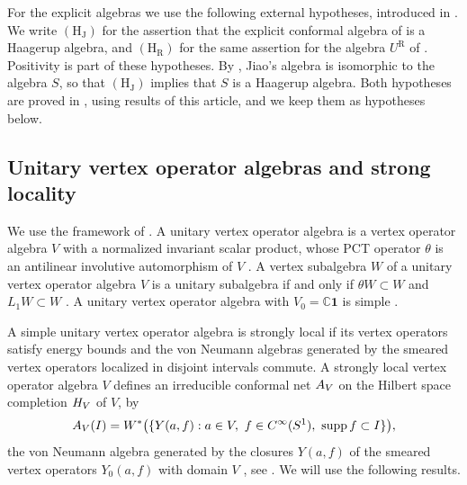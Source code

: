 \documentclass[leqno]{article}
\newcommand{\Cbb}{\ensuremath{\mathbb{C}}}
\let\cal\relax
\newcommand{\cal}{\mathcal}
\numberwithin{equation}{section}
\begin{document}
For the explicit algebras we use the following external hypotheses, introduced in \cite[Section 1]{Arh26}. We write $\mathrm{(H_J)}$ for the assertion that the explicit conformal algebra of \cite{Jia26} is a Haagerup algebra, and $\mathrm{(H_R)}$ for the same assertion for the algebra $U^{\mathrm R}$ of \cite{Rie26}. Positivity is part of these hypotheses. By \cite[Theorem 10.24]{Arh26}, Jiao's algebra is isomorphic to the algebra $S$, so that $\mathrm{(H_J)}$ implies that $S$ is a Haagerup algebra. Both hypotheses are proved in \cite[Theorems 6.1 and 7.13(1)]{ArhIII}, using results of this article, and we keep them as hypotheses below.

\subsection{Unitary vertex operator algebras and strong locality}
\label{subsec:unitary}

We use the framework of \cite{CKLW18}. A unitary vertex operator algebra is a vertex operator algebra $V$ with a normalized invariant scalar product, whose PCT operator $\theta$ is an antilinear involutive automorphism of $V$ \cite[Section 5]{CKLW18}. A vertex subalgebra $W$ of a unitary vertex operator algebra $V$ is a unitary subalgebra if and only if $\theta W \subset W$ and $L_1W \subset W$ \cite[Proposition 5.23 p.~43]{CKLW18}. A unitary vertex operator algebra with $V_0 = \Cbb\mathbf 1$ is simple \cite[Proposition 5.3 p.~34]{CKLW18}.

A simple unitary vertex operator algebra is strongly local if its vertex operators satisfy energy bounds and the von Neumann algebras generated by the smeared vertex operators localized in disjoint intervals commute. A strongly local vertex operator algebra $V$ defines an irreducible conformal net $\cal A_V$ on the Hilbert space completion $\cal H_V$ of $V$, by
\[
\cal A_V(I) = W^*\big(\{Y(a,f) : a \in V,\ f \in C^\infty(S^1),\ \operatorname{supp} f \subset I\}\big),
\]
the von Neumann algebra generated by the closures $Y(a,f)$ of the smeared vertex operators $Y_0(a,f)$ with domain $V$ \cite[(106) p.~49 and (114) p.~50]{CKLW18}, see \cite[Theorem 6.8 p.~53]{CKLW18}. We will use the following results.
\end{document}
